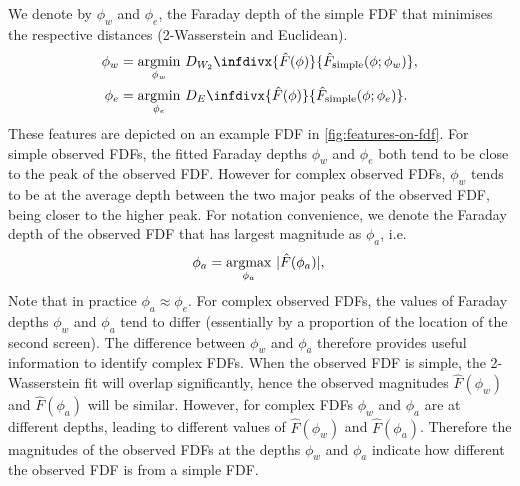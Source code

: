     We denote by $\phi_w$ and $\phi_e$, the Faraday depth of the simple FDF that minimises the respective distances
    (2-Wasserstein and Euclidean).
    \begin{align*}
       \phi_w &= \underset{\phi_w}{\mathrm{argmin}}\ D_{W_2}\infdivx{\hat F(\phi)}{\hat F_{\mathrm{simple}}(\phi; \phi_w)},\\
       \phi_e &= \underset{\phi_e}{\mathrm{argmin}}\ D_E\infdivx{\hat F(\phi)}{\hat F_{\mathrm{simple}}(\phi; \phi_e)}.
     \end{align*}
     These features are depicted on an example FDF in \autoref{fig:features-on-fdf}.
     For simple observed FDFs, the fitted Faraday depths $\phi_w$ and $\phi_e$ both tend to be
     close to the peak of the observed FDF. However for complex observed FDFs, $\phi_w$ tends
     to be at the average depth between the two major peaks of the observed FDF, being closer
     to the higher peak. For notation convenience, we denote the Faraday depth of the
     observed FDF that has largest magnitude as $\phi_a$, i.e.
     \begin{equation*}
       \phi_a = \underset{\phi_a}{\mathrm{argmax}}\ |\hat F(\phi_a)|,\\
     \end{equation*}
     Note that in practice $\phi_a \approx \phi_e$.
     For complex observed FDFs, the values of Faraday depths $\phi_w$ and $\phi_a$ tend
     to differ (essentially by a proportion of the location of the second screen).
     The difference between $\phi_w$ and $\phi_a$ therefore provides useful information
     to identify complex FDFs.
     When the observed FDF is simple, the 2-Wasserstein fit will overlap significantly,
     hence the observed magnitudes $\hat F(\phi_w)$ and $\hat F(\phi_a)$ will be similar.
     However, for complex FDFs $\phi_w$ and $\phi_a$ are at different depths,
     leading to different values of $\hat F(\phi_w)$ and $\hat F(\phi_a)$.
     Therefore the magnitudes of the observed FDFs at the depths $\phi_w$ and $\phi_a$
     indicate how different the observed FDF is from a simple FDF.

